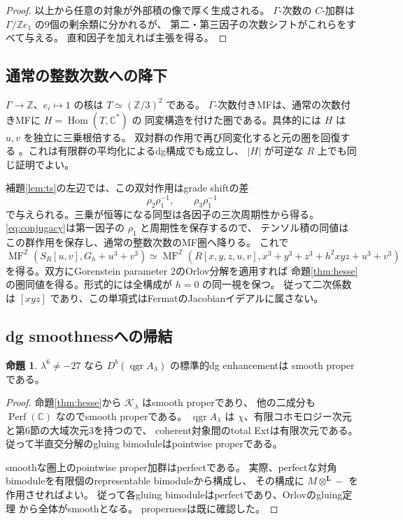\documentclass[a4paper,11pt]{ltjsarticle}
\theoremstyle{definition}
\newtheorem{theorem}{命題}[section]
\newcommand{\CC}{\mathbb C}
\newcommand{\Perf}{\operatorname{Perf}}
\newcommand{\qgr}{\operatorname{qgr}}
\newcommand{\MF}{\operatorname{MF}}
\begin{document}
\begin{proof}
以上から任意の対象が外部積の像で厚く生成される。
$\Gamma$-次数の $C$-加群は $\Gamma/\mathbb Ze_1$ の9個の剰余類に分かれるが、
第二・第三因子の次数シフトがこれらをすべて与える。
直和因子を加えれば主張を得る。
\end{proof}

\subsection{通常の整数次数への降下}

$\Gamma\to\mathbb Z$、$e_i\mapsto1$ の核は
$T\simeq(\mathbb Z/3)^2$ である。
$\Gamma$-次数付きMFは、通常の次数付きMFに $H=\operatorname{Hom}(T,\CC^*)$ の
同変構造を付けた圏である。具体的には $H$ は $u,v$ を独立に三乗根倍する。
双対群の作用で再び同変化すると元の圏を回復する
\cite[Theorem 4.2]{Elagin}。これは有限群の平均化によるdg構成でも成立し、
$|H|$ が可逆な $R$ 上でも同じ証明でよい。

補題\ref{lem:ts}の左辺では、この双対作用はgrade shiftの差
\[
 \rho_2\rho_1^{-1},\qquad\rho_3\rho_1^{-1}
\]
で与えられる。三乗が恒等になる同型は各因子の三次周期性から得る。
\eqref{eq:conjugacy}は第一因子の $\rho_1$ と周期性を保存するので、
テンソル積の同値はこの群作用を保存し、通常の整数次数のMF圏へ降りる。
これで
\[
 \MF^{\mathbb Z}(S_R[u,v],G_h+u^3+v^3)
 \simeq
 \MF^{\mathbb Z}(R[x,y,z,u,v],x^3+y^3+z^3+h^2xyz+u^3+v^3)
\]
を得る。双方にGorenstein parameter 2のOrlov分解を適用すれば
命題\ref{thm:hesse}の圏同値を得る。形式的には全構成が $h=0$ の同一視を保つ。
従って二次係数は $[xyz]$ であり、この単項式はFermatのJacobianイデアルに属さない。

\subsection{dg smoothnessへの帰結}

\begin{theorem}\label{thm:dg-smooth}
$\lambda^6\ne-27$ なら $D^b(\qgr A_\lambda)$ の標準的dg enhancementは
smooth properである。
\end{theorem}
\begin{proof}
命題\ref{thm:hesse}から $\mathcal K_\lambda$ はsmooth properであり、
他の二成分も $\Perf(\CC)$ なのでsmooth properである。
$\qgr A_\lambda$ は $\chi$、有限コホモロジー次元と第6節の大域次元3を持つので、
coherent対象間のtotal Extは有限次元である。
従って半直交分解のgluing bimoduleはpointwise properである。

smoothな圏上のpointwise proper加群はperfectである。
実際、perfectな対角bimoduleを有限個のrepresentable bimoduleから構成し、
その構成に $M\otimes^{\mathbf L}-$ を作用させればよい。
従って各gluing bimoduleはperfectであり、Orlovのgluing定理
\cite[Proposition 3.8, Theorem 3.25]{OrlovGlue}から全体がsmoothとなる。
propernessは既に確認した。
\end{proof}
\end{document}
